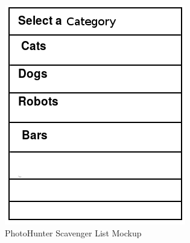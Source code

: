 \documentclass{article}
\begin{document}
\begin{figure}[H]
  \caption{PhotoHunter Scavenger List Mockup}
  \centering
  \includegraphics[width =\textwidth, height=\textheight, keepaspectratio]{ss_photohunter_dataset}
\end{figure}
\end{document}
